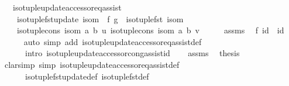 \begin{isabellebody}
\ \ \ {\isachardoublequoteopen}iso{\isacharunderscore}{\kern0pt}tuple{\isacharunderscore}{\kern0pt}update{\isacharunderscore}{\kern0pt}accessor{\isacharunderscore}{\kern0pt}eq{\isacharunderscore}{\kern0pt}assist\isanewline
\ \ \ \ {\isacharparenleft}{\kern0pt}iso{\isacharunderscore}{\kern0pt}tuple{\isacharunderscore}{\kern0pt}fst{\isacharunderscore}{\kern0pt}update\ isom\ {\isasymcirc}\ f{\isacharparenright}{\kern0pt}\ {\isacharparenleft}{\kern0pt}g\ {\isasymcirc}\ iso{\isacharunderscore}{\kern0pt}tuple{\isacharunderscore}{\kern0pt}fst\ isom{\isacharparenright}{\kern0pt}\isanewline
\ \ \ \ {\isacharparenleft}{\kern0pt}iso{\isacharunderscore}{\kern0pt}tuple{\isacharunderscore}{\kern0pt}cons\ isom\ a\ b{\isacharparenright}{\kern0pt}\ u\ {\isacharparenleft}{\kern0pt}iso{\isacharunderscore}{\kern0pt}tuple{\isacharunderscore}{\kern0pt}cons\ isom\ a{\isacharprime}{\kern0pt}\ b{\isacharparenright}{\kern0pt}\ v{\isachardoublequoteclose}\isanewline
%
\isadelimproof
%
\endisadelimproof
%
\isatagproof
{}\isamarkupfalse%
\ {\isacharminus}{\kern0pt}\isanewline
\ \ \isamarkupfalse%
\ assms\ \isamarkupfalse%
\ {\isachardoublequoteopen}f\ id\ {\isacharequal}{\kern0pt}\ id{\isachardoublequoteclose}\isanewline
\ \ \ \ \isamarkupfalse%
\ {\isacharparenleft}{\kern0pt}auto\ simp\ add{\isacharcolon}{\kern0pt}\ iso{\isacharunderscore}{\kern0pt}tuple{\isacharunderscore}{\kern0pt}update{\isacharunderscore}{\kern0pt}accessor{\isacharunderscore}{\kern0pt}eq{\isacharunderscore}{\kern0pt}assist{\isacharunderscore}{\kern0pt}def\isanewline
\ \ \ \ \ \ intro{\isacharcolon}{\kern0pt}\ iso{\isacharunderscore}{\kern0pt}tuple{\isacharunderscore}{\kern0pt}update{\isacharunderscore}{\kern0pt}accessor{\isacharunderscore}{\kern0pt}cong{\isacharunderscore}{\kern0pt}assist{\isacharunderscore}{\kern0pt}id{\isacharparenright}{\kern0pt}\isanewline
\ \ \isamarkupfalse%
\ assms\ \isamarkupfalse%
\ {\isacharquery}{\kern0pt}thesis\isanewline
\ \ \ \ \isamarkupfalse%
\ {\isacharparenleft}{\kern0pt}clarsimp\ simp{\isacharcolon}{\kern0pt}\ iso{\isacharunderscore}{\kern0pt}tuple{\isacharunderscore}{\kern0pt}update{\isacharunderscore}{\kern0pt}accessor{\isacharunderscore}{\kern0pt}eq{\isacharunderscore}{\kern0pt}assist{\isacharunderscore}{\kern0pt}def\isanewline
\ \ \ \ \ \ iso{\isacharunderscore}{\kern0pt}tuple{\isacharunderscore}{\kern0pt}fst{\isacharunderscore}{\kern0pt}update{\isacharunderscore}{\kern0pt}def\ iso{\isacharunderscore}{\kern0pt}tuple{\isacharunderscore}{\kern0pt}fst{\isacharunderscore}{\kern0pt}def\isanewline

\end{isabellebody}
